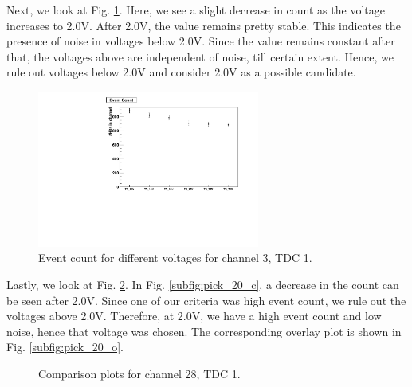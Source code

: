 \documentclass[a4paper]{report}
\numberwithin{equation}{section}
\begin{document}
Next, we look at Fig. \ref{fig:rm_below_20}. Here, we see a slight decrease in count as the voltage increases to 2.0V. After 2.0V, the value remains pretty stable. This indicates the presence of noise in voltages below 2.0V. Since the value remains constant after that, the voltages above are independent of noise, till certain extent. Hence, we rule out voltages below 2.0V and consider 2.0V as a possible candidate. 

\begin{figure}[htpb]
    \centering
    \includegraphics[width=0.65\textwidth]{StyxThresholdScan_1_3_Rate.pdf}
    \caption{Event count for different voltages for channel 3, TDC 1.}
    \label{fig:rm_below_20}
\end{figure}

Lastly, we look at Fig. \ref{fig:pick_20}. In Fig. \ref{subfig:pick_20_c}, a decrease in the count can be seen after 2.0V. Since one of our criteria was high event count, we rule out the voltages above 2.0V. Therefore, at 2.0V, we have a high event count and low noise, hence that voltage was chosen. The corresponding overlay plot is shown in Fig. \ref{subfig:pick_20_o}. 

\begin{figure}[htb]
	\centering
	\quad
	\centering
	\caption{Comparison plots for channel 28, TDC 1.}
	\label{fig:pick_20}
\end{figure}
\end{document}
